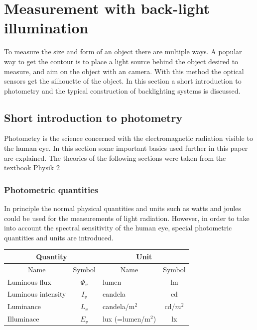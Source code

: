 \section{Measurement with back-light illumination}
To measure the size and form of an object there are multiple ways. A popular way to get the contour is to place a light source behind the object desired to measure, and aim on the object with an camera. With this method the optical sensors get the silhouette of the object. In this section a short introduction to photometry and the typical construction of backlighting systems is discussed.
\subsection{Short introduction to photometry}
Photometry is the science concerned with the electromagnetic radiation visible to the human eye. In this section some important basics used further in this paper are explained. The theories of the following sections were taken from the textbook Physik 2 \cite{ruh}
\subsubsection{Photometric quantities}
In principle the normal physical quantities and units such as watts and joules could be used for the measurements of light radiation. However, in order to take into account the spectral sensitivity of the human eye, special photometric quantities and units are introduced.\\

\begin{table}[ht]
\centering
\begin{tabular}{ |p{6cm} p{2cm}|p{6cm} p{2cm}|  }
	\hline
	\multicolumn{2}{|c}{Quantity}&\multicolumn{2}{|c|}{Unit} \\
	\hline\hline
	\multicolumn{1}{|c}{Name}			& \multicolumn{1}{|c|}{Symbol}	& \multicolumn{1}{c}{Name}	& \multicolumn{1}{|c|}{Symbol}	\\

	\hline
	Luminous flux		& \multicolumn{1}{|c|}{$\Phi_v$}	& lumen		& \multicolumn{1}{|c|}{lm}\\
	Luminous intensity 	& \multicolumn{1}{|c|}{$I_v$} 		& candela	& \multicolumn{1}{|c|}{cd}\\
	Luminance			& \multicolumn{1}{|c|}{$L_v$}		& candela/$\text{m}^2$	& \multicolumn{1}{|c|}{cd/$m^2$}\\
	Illuminace 			& \multicolumn{1}{|c|}{$E_v$} 		& lux (=lumen/$\text{m}^2$) 	& \multicolumn{1}{|c|}{lx}\\

	\hline
\end{tabular}
\end{table}

